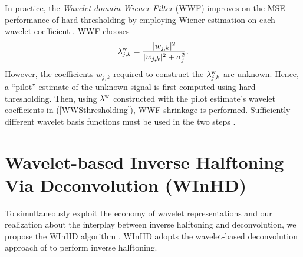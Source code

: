 \documentclass[11pt]{article}
\def\nnbothk {k}
\begin{document}
In practice, the {\em Wavelet-domain Wiener Filter} (WWF) improves on
the MSE performance of hard thresholding by employing Wiener
estimation on each wavelet coefficient  \cite{sandeep,choi}. WWF chooses
\begin{eqnarray}
\lambda_{j,\nnbothk}^{\rm w}=\frac{|{w}_{j,\nnbothk}|^2}{|{w}_{j,\nnbothk}|^2 +
\sigma_j^2}.
\label{WWSthresholding}
\end{eqnarray}
However, the coefficients ${w}_{j,\nnbothk}$ required to construct the
$\lambda_{j,\nnbothk}^{\rm w}$ are unknown. Hence, a ``pilot''
estimate of the unknown signal is first computed using hard
thresholding. Then, using $\lambda^{\rm w}$ constructed with the pilot
estimate's wavelet coefficients in (\ref{WWSthresholding}), WWF
shrinkage is performed. Sufficiently different wavelet basis functions
must be used in the two steps \cite{sandeep,choi}.



\section{Wavelet-based Inverse Halftoning Via Deconvolution (\mbox{WInHD}) }
\label{WVDDecon}
\sloppy To simultaneously exploit the economy of wavelet
representations and our realization about the interplay between
inverse halftoning and deconvolution, we propose the \mbox{WInHD}
algorithm \cite{neelsh_iht_icip}.  \mbox{WInHD} adopts the wavelet-based
deconvolution approach of \cite{nonlin-soln-don} to perform inverse
halftoning.
\end{document}
